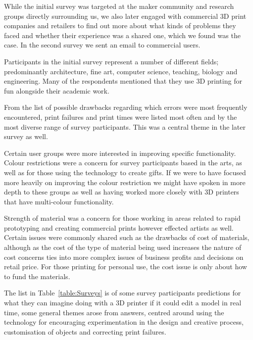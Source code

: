 \documentclass[11pt]{report} %
\begin{document}
While the initial survey was targeted at the maker community and research groups directly surrounding us, we also later engaged with commercial 3D print companies and retailers to find out more about what kinds of problems they faced and whether their experience was a shared one, which we found was the case. In the second survey we sent an email to commercial users. 

Participants in the initial survey represent a number of different fields; predominantly architecture, fine art, computer science, teaching, biology and engineering. Many of the respondents mentioned that they use 3D printing for fun alongside their academic work. 

From the list of possible drawbacks regarding which errors were most frequently encountered, print failures and print times were listed most often and by the most diverse range of survey participants. This was a central theme in the later survey as well.

Certain user groups were more interested in improving specific functionality. Colour restrictions were a concern for survey participants based in the arts, as well as for those using the technology to create gifts. If we were to have focused more heavily on improving the colour restriction we might have spoken in more depth to these groups as well as having worked more closely with 3D printers that have multi-colour functionality. 

Strength of material was a concern for those working in areas related to rapid prototyping and creating commercial prints however effected artists as well. Certain issues were commonly shared such as the drawbacks of cost of materials, although as the cost of the type of material being used increases the nature of cost concerns ties into more complex issues of business profits and decisions on retail price. For those printing for personal use, the cost issue is only about how to fund the materials. 

The list in Table~\ref{table:Surveys} is of some survey participants predictions for what they can imagine doing with a 3D printer if it could edit a model in real time, some general themes arose from answers, centred around using the technology for encouraging experimentation in the design and creative process, customisation of objects and correcting print failures.
\end{document}
